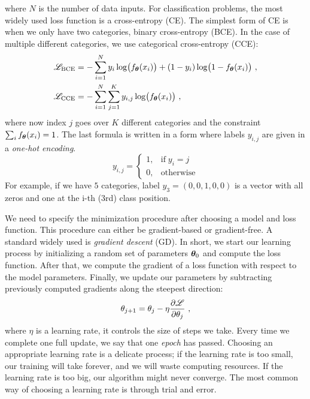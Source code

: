 where $N$ is the number of data inputs. For classification problems, the most widely used loss function is a cross-entropy (CE). The simplest form of CE is when we only have two categories, binary cross-entropy (BCE). In the case of multiple different categories, we use categorical cross-entropy (CCE):
\begin{align}
	\mathcal{L}_{\text{BCE}} &= -\sum_{i=1}^N y_i\log(f_{\boldsymbol{\theta}}(x_i)) + (1-y_i)\log(1-f_{\boldsymbol{\theta}}(x_i)) \ , \\
	\mathcal{L}_{\text{CCE}} &= -\sum_{i=1}^N\sum_{j=1}^K y_{i,j}\log(f_{\boldsymbol{\theta}}(x_i)) \ ,
\end{align}
where now index $j$ goes over $K$ different categories and the constraint $\sum_i f_{\boldsymbol{\theta}}(x_i)=1$. The last formula is written in a form where labels $y_{i,j}$ are given in a \textit{one-hot encoding}. 
\begin{equation}
	y_{i,j} = \begin{cases}
		1, & \text{if} \; y_i=j \\
		0, & \text{otherwise}
	\end{cases}
\end{equation}
For example, if we have $5$ categories, label $y_3 = (0,0,1,0,0)$ is a vector with all zeros and one at the i-th ($3$rd) class position.
\par
We need to specify the minimization procedure after choosing a model and loss function. This procedure can either be gradient-based or gradient-free. A standard widely used is \textit{gradient descent} (GD). In short, we start our learning process by initializing a random set of parameters $\boldsymbol{\theta}_0$ and compute the loss function. After that, we compute the gradient of a loss function with respect to the model parameters. Finally, we update our parameters by subtracting previously computed gradients along the steepest direction:
\begin{equation}
	\theta_{j+1} = \theta_j - \eta \pdv{\mathcal{L}}{\theta_j} \ ,
\end{equation}
where $\eta$ is a learning rate, it controls the size of steps we take. Every time we complete one full update, we say that one \textit{epoch} has passed. Choosing an appropriate learning rate is a delicate process; if the learning rate is too small, our training will take forever, and we will waste computing resources. If the learning rate is too big, our algorithm might never converge. The most common way of choosing a learning rate is through trial and error.
\par
